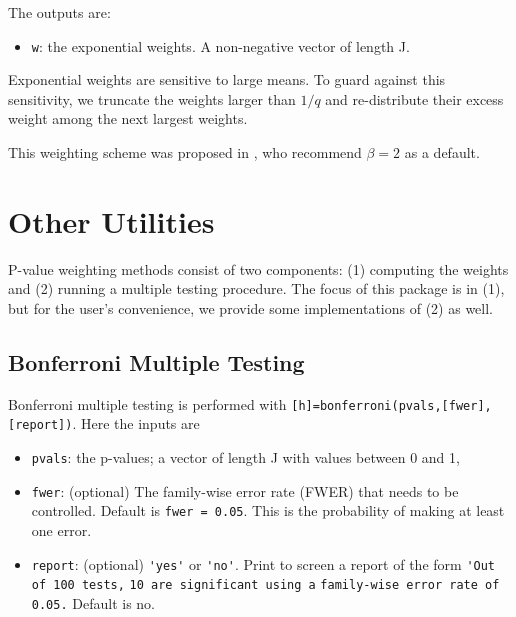 \documentclass[english,11pt]{article} %
\begin{document}
The outputs are: 
\begin{itemize}
\item \verb+w+:  the exponential weights. A non-negative vector of length J.
\end{itemize}

Exponential weights are sensitive to large means. To guard against this sensitivity, we truncate the weights larger than $1/q$ and re-distribute their excess weight among the next largest weights. 

This weighting scheme was proposed in \citep{roeder2006using}, who recommend $\beta = 2$ as a default. 


\section{Other Utilities}
\label{methods_plus}

P-value weighting methods consist of two components: (1) computing the weights and (2) running a multiple testing procedure. The focus of this package is in (1), but for the user's convenience, we provide some implementations of (2) as well.

\subsection{Bonferroni Multiple Testing}


Bonferroni multiple testing is performed with \verb+[h]=bonferroni(pvals,[fwer],[report])+. Here the inputs are 

\begin{itemize}
\item \verb+pvals+:  the p-values; a vector of length J with values between 0 and 1, 
\item \verb+fwer+: (optional) The family-wise error rate (FWER) that needs to be controlled. Default is \verb+fwer = 0.05+. This is the probability of making at least one error.  
\item \verb+report+: (optional) \verb+'yes'+ or \verb+'no'+. Print to screen a report of the form \verb+'Out of 100 tests,+  \verb+10 are significant using a+  \verb+family-wise error rate of 0.05.+ Default is no.
\end{itemize}
\end{document}
